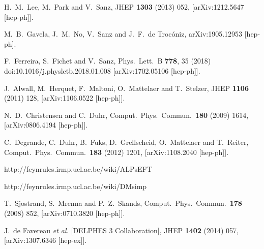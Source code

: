 \documentclass[prd,aps,letterpaper,floatfix,superscriptaddress,preprintnumbers,twocolumn,10pt,nofootinbib]{revtex4-1}
\begin{document}
\begin{thebibliography}{99}
  H.~M.~Lee, M.~Park and V.~Sanz,
  JHEP {\bf 1303} (2013) 052,
  [arXiv:1212.5647 [hep-ph]].

  M.~B.~Gavela, J.~M.~No, V.~Sanz and J.~F.~de Trocóniz,
  arXiv:1905.12953 [hep-ph].


  F.~Ferreira, S.~Fichet and V.~Sanz,
  Phys.\ Lett.\ B {\bf 778}, 35 (2018)
  doi:10.1016/j.physletb.2018.01.008
  [arXiv:1702.05106 [hep-ph]].
  
  J.~Alwall, M.~Herquet, F.~Maltoni, O.~Mattelaer and T.~Stelzer,
  JHEP {\bf 1106} (2011) 128,
  [arXiv:1106.0522 [hep-ph]].
  
  N.~D.~Christensen and C.~Duhr,
  Comput.\ Phys.\ Commun.\  {\bf 180} (2009) 1614,
  [arXiv:0806.4194 [hep-ph]].

  C.~Degrande, C.~Duhr, B.~Fuks, D.~Grellscheid, O.~Mattelaer and T.~Reiter,
  Comput.\ Phys.\ Commun.\  {\bf 183} (2012) 1201,
  [arXiv:1108.2040 [hep-ph]].

http://feynrules.irmp.ucl.ac.be/wiki/ALPsEFT

http://feynrules.irmp.ucl.ac.be/wiki/DMsimp


  
  T.~Sjostrand, S.~Mrenna and P.~Z.~Skands,
  Comput.\ Phys.\ Commun.\  {\bf 178} (2008) 852,
  [arXiv:0710.3820 [hep-ph]].
  
  J.~de Favereau {\it et al.} [DELPHES 3 Collaboration],
  JHEP {\bf 1402} (2014) 057,
  [arXiv:1307.6346 [hep-ex]].
  
\end{thebibliography}
\end{document}

